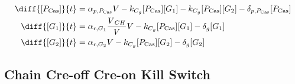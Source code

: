 \begin{align}
\diff{\conc{\proSp{\cas{}}}}{t} & =  \txtlRate{\proSp{\cas{}}}\vectorGen{} - \gRnaBind{}\conc{\proSp{\cas{}}}\conc{\gRna{1}} - \gRnaBind{}\conc{\proSp{\cas{}}}\conc{\gRna{2}} - \proDegradeRate{\proSp{\cas{}}}\conc{\proSp{\cas{}}}\\
\diff{\conc{\gRna{1}}}{t} & =  \txRate{\gRna{1}}\frac{\vectorGen{}_{CH}}{\vectorGen{}}\vectorGen{} - \gRnaBind{}\conc{\proSp{\cas{}}}\conc{\gRna{1}} - \rnaDegradeRate{}\conc{\gRna{1}}\\
\diff{\conc{\gRna{2}}}{t} & =  \txRate{\gRna{2}}\vectorGen{} - \gRnaBind{}\conc{\proSp{\cas{}}}\conc{\gRna{2}} - \rnaDegradeRate{}\conc{\gRna{2}}
\end{align}

\subsection{Chain Cre-off Cre-on Kill Switch}
\label{s:Chain_Cre_off_Cre_on_Kill_Switch}

